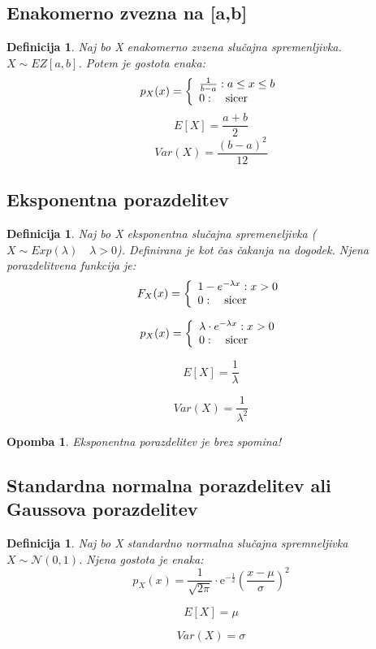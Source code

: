 \documentclass[11pt]{article}
\newtheorem{Definicija}[Izrek]{{\sc Definicija}}
\newtheorem{Opomba}[Izrek]{{\sc Opomba}}
\begin{document}
\subsection{Enakomerno zvezna na [a,b] }
\begin{Definicija}
	Naj bo X enakomerno zvzena slučajna spremenljivka. $X \sim EZ[a,b]$. Potem je gostota enaka:
	$$ p_X(x) = \left \{\begin{array}{lr}
	\frac{1}{b-a} : a\le x\le b \\ 0 :\quad \textnormal{sicer}
	  \end{array}
	  \right.
	$$
	$$E[X] = \frac{a+b}{2}$$
	$$Var(X) = \frac{(b-a)^2}{12}$$
\end{Definicija}
\subsection{Eksponentna porazdelitev}
\begin{Definicija}
	Naj bo X eksponentna slučajna spremeneljivka ($X\sim Exp(\lambda) \quad \lambda >0$). Definirana je kot čas čakanja na dogodek.
	Njena porazdelitvena funkcija je:
		$$ F_X(x) = \left \{\begin{array}{lr}
		1 - e^{-\lambda x}:  x>0 
		\\
		0 :\quad \textnormal{sicer}
		\end{array}\right.$$
		
		$$ p_X(x) = \left \{\begin{array}{lr}
		\lambda\cdot e^{-\lambda x} : x>0
		\\
		0 :\quad \textnormal{sicer}
		\end{array}
		\right.
		$$
		
		$$E[X] = \frac{1}{\lambda}$$
		
		$$Var(X) = \frac{1}{\lambda^2}$$
\end{Definicija}
\begin{Opomba}
	Eksponentna porazdelitev je brez spomina!
\end{Opomba}
\subsection{Standardna normalna porazdelitev ali Gaussova porazdelitev}
\begin{Definicija}
	Naj bo X standardno normalna slučajna spremneljivka $X\sim \mathcal{N}(0,1)$.
	Njena gostota je enaka:
	$$p_X(x) = \frac{1}{\sqrt{2\pi}}\cdot \mathrm{e}^{-\frac{1}{2}}(\frac{x - \mu}{\sigma})^2$$
	
	$$E[X] = \mu$$
	
	$$Var(X) = \sigma$$
\end{Definicija}
\end{document}
